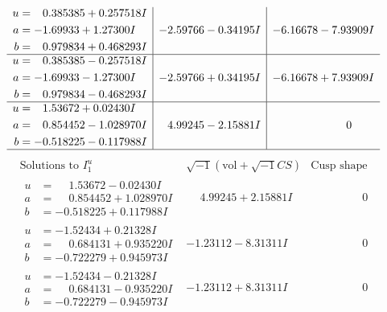 \documentclass[1p]{elsarticle_modified}
\theoremstyle{definition}
\newcommand{\I}{\sqrt{-1}}
\begin{document}
$$\begin{array}{c|c|c}
\begin{aligned}
u &= \phantom{-}0.385385 + 0.257518 I \\
a &= -1.69933 + 1.27300 I \\
b &= \phantom{-}0.979834 + 0.468293 I\end{aligned}
 & -2.59766 - 0.34195 I & -6.16678 - 7.93909 I \\ \hline\begin{aligned}
u &= \phantom{-}0.385385 - 0.257518 I \\
a &= -1.69933 - 1.27300 I \\
b &= \phantom{-}0.979834 - 0.468293 I\end{aligned}
 & -2.59766 + 0.34195 I & -6.16678 + 7.93909 I \\ \hline\begin{aligned}
u &= \phantom{-}1.53672 + 0.02430 I \\
a &= \phantom{-}0.854452 - 1.028970 I \\
b &= -0.518225 - 0.117988 I\end{aligned}
 & \phantom{-}4.99245 - 2.15881 I & \phantom{-0.000000 } 0\\
 \hline 
 \end{array}$$\newpage$$\begin{array}{c|c|c}  
\text{Solutions to }I^u_{1}& \I (\text{vol} + \sqrt{-1}CS) & \text{Cusp shape}\\
 \hline 
\begin{aligned}
u &= \phantom{-}1.53672 - 0.02430 I \\
a &= \phantom{-}0.854452 + 1.028970 I \\
b &= -0.518225 + 0.117988 I\end{aligned}
 & \phantom{-}4.99245 + 2.15881 I & \phantom{-0.000000 } 0 \\ \hline\begin{aligned}
u &= -1.52434 + 0.21328 I \\
a &= \phantom{-}0.684131 + 0.935220 I \\
b &= -0.722279 + 0.945973 I\end{aligned}
 & -1.23112 - 8.31311 I & \phantom{-0.000000 } 0 \\ \hline\begin{aligned}
u &= -1.52434 - 0.21328 I \\
a &= \phantom{-}0.684131 - 0.935220 I \\
b &= -0.722279 - 0.945973 I\end{aligned}
 & -1.23112 + 8.31311 I & \phantom{-0.000000 } 0 \\ \hline\begin{aligned}

\end{aligned}
\end{array}$$
\end{document}
